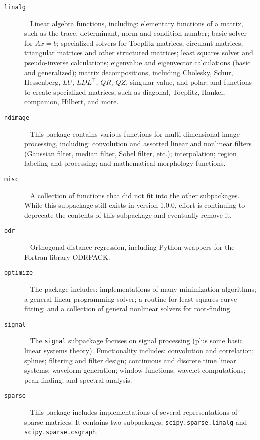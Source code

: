 \begin{description}
\item[\texttt{linalg}] ~ \newline
    Linear algebra functions, including:
    elementary functions of a matrix, such as the trace, determinant, norm and
    condition number;
    basic solver for $Ax = b$;
    specialized solvers for Toeplitz matrices, circulant matrices, triangular
    matrices and other structured matrices; least squares solver and
    pseudo-inverse calculations; eigenvalue and eigenvector calculations
    (basic and generalized); matrix decompositions, including Cholesky, Schur,
    Hessenberg, $LU$, $LDL^{\intercal}$, $QR$, $QZ$, singular value, and polar;
    and functions to create specialized matrices, such as diagonal, Toeplitz,
    Hankel, companion, Hilbert, and more.
\item[\texttt{ndimage}] ~ \newline
    This package contains various functions for multi-dimensional image
    processing, including: convolution and assorted linear and nonlinear
    filters (Gaussian filter, median filter, Sobel filter, etc.);
    interpolation; region labeling and processing; and mathematical morphology
    functions.
\item[\texttt{misc}] ~ \newline
    A collection of functions that did not fit into the other subpackages.
    While this subpackage still exists in version 1.0.0, effort is continuing
    to deprecate the contents of this subpackage and eventually remove it.
\item[\texttt{odr}] ~ \newline
    Orthogonal distance regression, including Python wrappers for the Fortran
    library ODRPACK.
\item[\texttt{optimize}] ~ \newline
    The package includes:
    implementations of many minimization algorithms; a general linear
    programming solver; a routine for least-squares curve fitting; and a
    collection of general nonlinear solvers for root-finding.
\item[\texttt{signal}] ~ \newline
    The \texttt{signal} subpackage focuses on signal processing (plus some
    basic linear systems theory).  Functionality includes:
    convolution and correlation; splines; filtering and filter design;
    continuous and discrete time linear systems; waveform generation;
    window functions; wavelet computations; peak finding; and spectral
    analysis.  
\item[\texttt{sparse}] ~ \newline
    This package includes implementations of several representations of
    sparse matrices.  It contains two subpackages, 
    \texttt{scipy.sparse.linalg} and \texttt{scipy.sparse.csgraph}.


\end{description}
